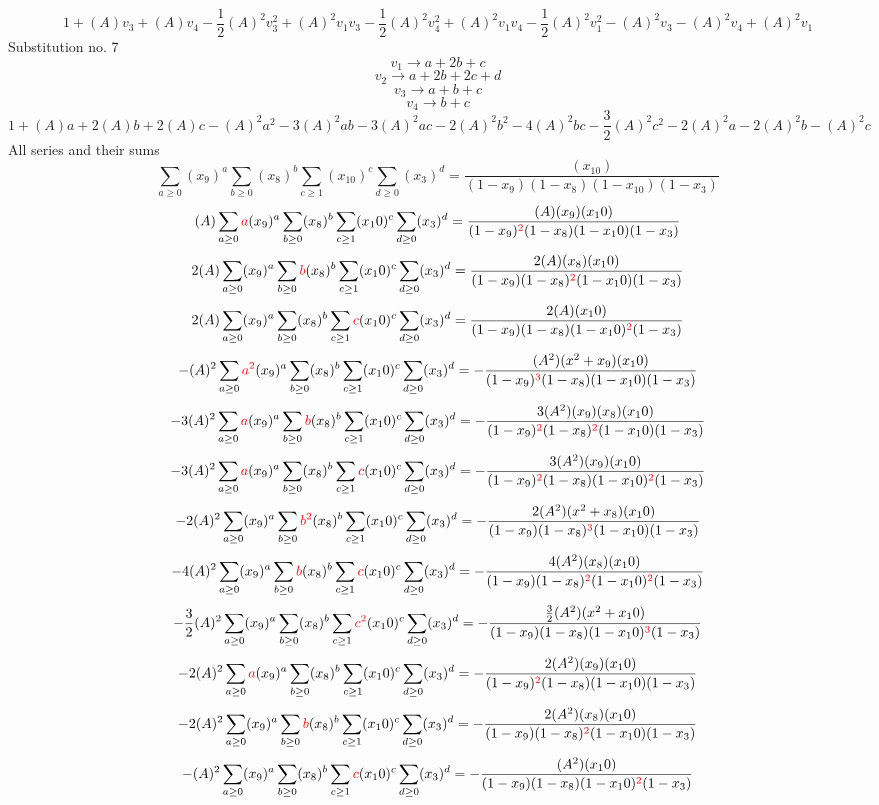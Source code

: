 \documentclass{article}
\begin{document}
\[1+(A)v_3+(A)v_4-\frac{1}{2}(A)^2v_3^{2}+(A)^2v_1v_3-\frac{1}{2}(A)^2v_4^{2}+(A)^2v_1v_4-\frac{1}{2}(A)^2v_1^{2}-(A)^2v_3-(A)^2v_4+(A)^2v_1\]Substitution no. 7\[v_1\rightarrow{a+2b+c}\]\[v_2\rightarrow{a+2b+2c+d}\]\[v_3\rightarrow{a+b+c}\]\[v_4\rightarrow{b+c}\]\[1+(A)a+2(A)b+2(A)c-(A)^2a^{2}-3(A)^2ab-3(A)^2ac-2(A)^2b^{2}-4(A)^2bc-\frac{3}{2}(A)^2c^{2}-2(A)^2a-2(A)^2b-(A)^2c\]All series and their sums\[\sum_{a\geq{0}}(x_9)^{a}\sum_{b\geq{0}}(x_8)^{b}\sum_{c\geq{1}}(x_10)^{c}\sum_{d\geq{0}}(x_3)^{d}=\frac{(x_10)}{(1-x_9)(1-x_8)(1-x_10)(1-x_3)}\]\[(A)\sum_{a\geq{0}}\textcolor{red}{a}(x_9)^{a}\sum_{b\geq{0}}(x_8)^{b}\sum_{c\geq{1}}(x_10)^{c}\sum_{d\geq{0}}(x_3)^{d}=\frac{(A)(x_9)(x_10)}{(1-x_9)^{\textcolor{red}{2}}(1-x_8)(1-x_10)(1-x_3)}\]\[2(A)\sum_{a\geq{0}}(x_9)^{a}\sum_{b\geq{0}}\textcolor{red}{b}(x_8)^{b}\sum_{c\geq{1}}(x_10)^{c}\sum_{d\geq{0}}(x_3)^{d}=\frac{2(A)(x_8)(x_10)}{(1-x_9)(1-x_8)^{\textcolor{red}{2}}(1-x_10)(1-x_3)}\]\[2(A)\sum_{a\geq{0}}(x_9)^{a}\sum_{b\geq{0}}(x_8)^{b}\sum_{c\geq{1}}\textcolor{red}{c}(x_10)^{c}\sum_{d\geq{0}}(x_3)^{d}=\frac{2(A)(x_10)}{(1-x_9)(1-x_8)(1-x_10)^{\textcolor{red}{2}}(1-x_3)}\]\[-(A)^{2}\sum_{a\geq{0}}\textcolor{red}{a^{2}}(x_9)^{a}\sum_{b\geq{0}}(x_8)^{b}\sum_{c\geq{1}}(x_10)^{c}\sum_{d\geq{0}}(x_3)^{d}=-\frac{(A^{2})(x^{2}+x_9)(x_10)}{(1-x_9)^{\textcolor{red}{3}}(1-x_8)(1-x_10)(1-x_3)}\]\[-3(A)^{2}\sum_{a\geq{0}}\textcolor{red}{a}(x_9)^{a}\sum_{b\geq{0}}\textcolor{red}{b}(x_8)^{b}\sum_{c\geq{1}}(x_10)^{c}\sum_{d\geq{0}}(x_3)^{d}=-\frac{3(A^{2})(x_9)(x_8)(x_10)}{(1-x_9)^{\textcolor{red}{2}}(1-x_8)^{\textcolor{red}{2}}(1-x_10)(1-x_3)}\]\[-3(A)^{2}\sum_{a\geq{0}}\textcolor{red}{a}(x_9)^{a}\sum_{b\geq{0}}(x_8)^{b}\sum_{c\geq{1}}\textcolor{red}{c}(x_10)^{c}\sum_{d\geq{0}}(x_3)^{d}=-\frac{3(A^{2})(x_9)(x_10)}{(1-x_9)^{\textcolor{red}{2}}(1-x_8)(1-x_10)^{\textcolor{red}{2}}(1-x_3)}\]\[-2(A)^{2}\sum_{a\geq{0}}(x_9)^{a}\sum_{b\geq{0}}\textcolor{red}{b^{2}}(x_8)^{b}\sum_{c\geq{1}}(x_10)^{c}\sum_{d\geq{0}}(x_3)^{d}=-\frac{2(A^{2})(x^{2}+x_8)(x_10)}{(1-x_9)(1-x_8)^{\textcolor{red}{3}}(1-x_10)(1-x_3)}\]\[-4(A)^{2}\sum_{a\geq{0}}(x_9)^{a}\sum_{b\geq{0}}\textcolor{red}{b}(x_8)^{b}\sum_{c\geq{1}}\textcolor{red}{c}(x_10)^{c}\sum_{d\geq{0}}(x_3)^{d}=-\frac{4(A^{2})(x_8)(x_10)}{(1-x_9)(1-x_8)^{\textcolor{red}{2}}(1-x_10)^{\textcolor{red}{2}}(1-x_3)}\]\[-\frac{3}{2}(A)^{2}\sum_{a\geq{0}}(x_9)^{a}\sum_{b\geq{0}}(x_8)^{b}\sum_{c\geq{1}}\textcolor{red}{c^{2}}(x_10)^{c}\sum_{d\geq{0}}(x_3)^{d}=-\frac{\frac{3}{2}(A^{2})(x^{2}+x_10)}{(1-x_9)(1-x_8)(1-x_10)^{\textcolor{red}{3}}(1-x_3)}\]\[-2(A)^{2}\sum_{a\geq{0}}\textcolor{red}{a}(x_9)^{a}\sum_{b\geq{0}}(x_8)^{b}\sum_{c\geq{1}}(x_10)^{c}\sum_{d\geq{0}}(x_3)^{d}=-\frac{2(A^{2})(x_9)(x_10)}{(1-x_9)^{\textcolor{red}{2}}(1-x_8)(1-x_10)(1-x_3)}\]\[-2(A)^{2}\sum_{a\geq{0}}(x_9)^{a}\sum_{b\geq{0}}\textcolor{red}{b}(x_8)^{b}\sum_{c\geq{1}}(x_10)^{c}\sum_{d\geq{0}}(x_3)^{d}=-\frac{2(A^{2})(x_8)(x_10)}{(1-x_9)(1-x_8)^{\textcolor{red}{2}}(1-x_10)(1-x_3)}\]\[-(A)^{2}\sum_{a\geq{0}}(x_9)^{a}\sum_{b\geq{0}}(x_8)^{b}\sum_{c\geq{1}}\textcolor{red}{c}(x_10)^{c}\sum_{d\geq{0}}(x_3)^{d}=-\frac{(A^{2})(x_10)}{(1-x_9)(1-x_8)(1-x_10)^{\textcolor{red}{2}}(1-x_3)}\]
\end{document}
